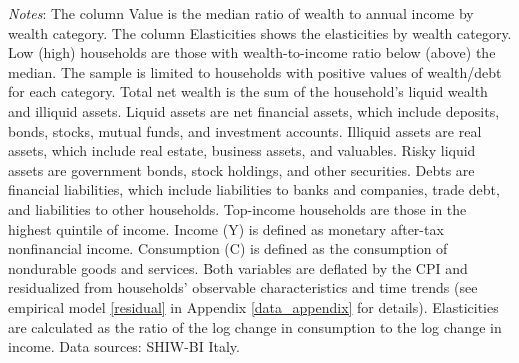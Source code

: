 \documentclass[12pt]{article}
\begin{document}
\begin{spacing}{1.5}
\begin{table}[H]
\raggedright{}\textit{\footnotesize{}Notes}{\footnotesize{}:
The column Value is the median ratio of wealth to annual income by wealth category.  The column Elasticities shows the elasticities by wealth category.  Low (high) households are those with wealth-to-income ratio below (above) the median. The sample is limited to households with positive values of wealth/debt for each category.
Total net wealth is the sum of the household’s liquid wealth and illiquid assets.  Liquid assets are net financial assets, which include deposits, bonds, stocks, mutual funds, and investment accounts.  Illiquid assets are real assets, which include real estate, business assets, and valuables. Risky liquid assets are government bonds, stock holdings, and other securities. Debts are financial liabilities, which include liabilities to banks and companies, trade debt, and liabilities to other households.  Top-income households are those in the highest quintile of income. Income (Y) is defined as monetary after-tax nonfinancial income. Consumption (C) is defined as the consumption of nondurable goods and services. Both variables are deflated by the CPI and residualized from households' observable characteristics and time trends (see empirical model \eqref{residual}
in Appendix \ref{data_appendix} for details).  Elasticities are calculated as the ratio of the log change in consumption to the log change in income.
Data sources:  SHIW-BI Italy.}{\footnotesize\par}

\end{table}


\end{spacing}
\end{document}
